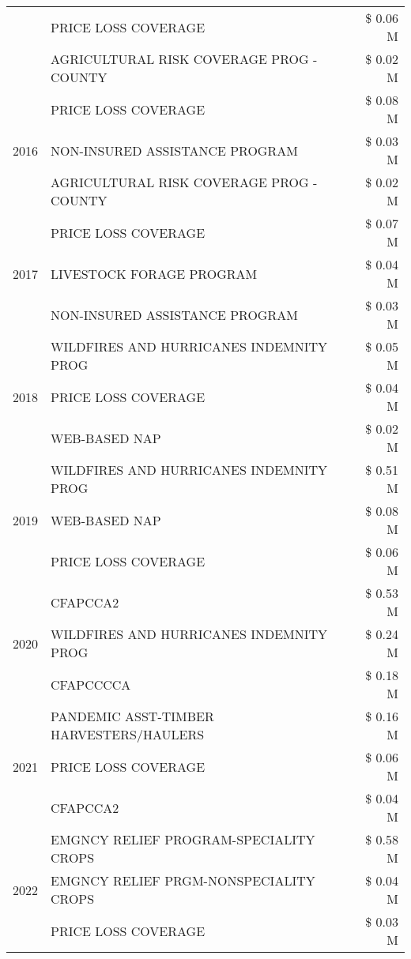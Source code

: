 \begin{tabular}{llr}
 & PRICE LOSS COVERAGE & \$ 0.06 M \\
 & AGRICULTURAL RISK COVERAGE PROG - COUNTY & \$ 0.02 M \\
\cline{1-3}
\multirow[t]{3}{*}{2016} & PRICE LOSS COVERAGE & \$ 0.08 M \\
 & NON-INSURED ASSISTANCE PROGRAM & \$ 0.03 M \\
 & AGRICULTURAL RISK COVERAGE PROG - COUNTY & \$ 0.02 M \\
\cline{1-3}
\multirow[t]{3}{*}{2017} & PRICE LOSS COVERAGE & \$ 0.07 M \\
 & LIVESTOCK FORAGE PROGRAM & \$ 0.04 M \\
 & NON-INSURED ASSISTANCE PROGRAM & \$ 0.03 M \\
\cline{1-3}
\multirow[t]{3}{*}{2018} & WILDFIRES AND HURRICANES INDEMNITY PROG & \$ 0.05 M \\
 & PRICE LOSS COVERAGE & \$ 0.04 M \\
 & WEB-BASED NAP & \$ 0.02 M \\
\cline{1-3}
\multirow[t]{3}{*}{2019} & WILDFIRES AND HURRICANES INDEMNITY PROG & \$ 0.51 M \\
 & WEB-BASED NAP & \$ 0.08 M \\
 & PRICE LOSS COVERAGE & \$ 0.06 M \\
\cline{1-3}
\multirow[t]{3}{*}{2020} & CFAPCCA2 & \$ 0.53 M \\
 & WILDFIRES AND HURRICANES INDEMNITY PROG & \$ 0.24 M \\
 & CFAPCCCCA & \$ 0.18 M \\
\cline{1-3}
\multirow[t]{3}{*}{2021} & PANDEMIC ASST-TIMBER HARVESTERS/HAULERS & \$ 0.16 M \\
 & PRICE LOSS COVERAGE & \$ 0.06 M \\
 & CFAPCCA2 & \$ 0.04 M \\
\cline{1-3}
\multirow[t]{3}{*}{2022} & EMGNCY RELIEF PROGRAM-SPECIALITY CROPS & \$ 0.58 M \\
 & EMGNCY RELIEF PRGM-NONSPECIALITY CROPS & \$ 0.04 M \\
 & PRICE LOSS COVERAGE & \$ 0.03 M \\
\cline{1-3}
\bottomrule
\end{tabular}
